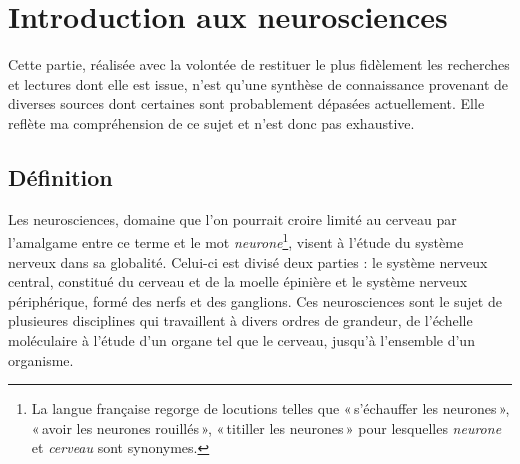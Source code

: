 \documentclass[12pt,fleqn,oneside,french,openany]{book} %
\begin{document}
\section{Introduction aux neurosciences} \label{sec:introNeuro}
\begin{remark}
	Cette partie, réalisée avec la volontée de restituer le plus fidèlement les recherches et lectures dont elle est issue, n'est qu'une synthèse de connaissance provenant de diverses sources dont certaines sont probablement dépasées actuellement. Elle reflète ma compréhension de ce sujet et n'est donc pas exhaustive.
\end{remark}

\subsection[Définition]{Définition \cite{wikineuro}} \label{ssec:definition} %
Les neurosciences, domaine que l'on pourrait croire limité au cerveau par l'amalgame entre ce terme et le mot \emph{neurone}\footnote{La langue française regorge de locutions telles que «\,s'échauffer les neurones\,», «\,avoir les neurones rouillés\,», «\,titiller les neurones\,» pour lesquelles \emph{neurone} et \emph{cerveau} sont synonymes.}, visent à l'étude du système nerveux dans sa globalité. Celui-ci est divisé deux parties : le système nerveux central, constitué du cerveau et de la moelle épinière et le système nerveux périphérique, formé des nerfs et des ganglions. Ces neurosciences sont le sujet de plusieures disciplines qui travaillent à divers ordres de grandeur, de l'échelle moléculaire à l'étude d'un organe tel que le cerveau, jusqu'à l'ensemble d'un organisme.

\begin{figure}[h]
\end{figure}
\end{document}
